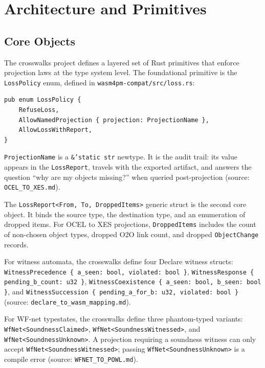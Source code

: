 
\section{Architecture and Primitives}
\label{sec:crosswalks-arch}

\subsection{Core Objects}
\label{sec:crosswalks-arch-objects}

The crosswalks project defines a layered set of Rust primitives that enforce projection laws at
the type system level. The foundational primitive is the \texttt{LossPolicy} enum, defined in
\texttt{wasm4pm-compat/src/loss.rs}:

\begin{verbatim}
pub enum LossPolicy {
    RefuseLoss,
    AllowNamedProjection { projection: ProjectionName },
    AllowLossWithReport,
}
\end{verbatim}

\texttt{ProjectionName} is a \texttt{\&'static str} newtype. It is the audit trail: its value
appears in the \texttt{LossReport}, travels with the exported artifact, and answers the question
``why are my objects missing?'' when queried post-projection (source: \texttt{OCEL\_TO\_XES.md}).

The \texttt{LossReport<From, To, DroppedItems>} generic struct is the second core object. It
binds the source type, the destination type, and an enumeration of dropped items. For \textsc{OCEL}
to \textsc{XES} projections, \texttt{DroppedItems} includes the count of non-chosen object types,
dropped \textsc{O2O} link count, and dropped \texttt{ObjectChange} records.

For witness automata, the crosswalks define four Declare witness structs: \texttt{WitnessPrecedence
\{ a\_seen: bool, violated: bool \}}, \texttt{WitnessResponse \{ pending\_b\_count: u32 \}},
\texttt{WitnessCoexistence \{ a\_seen: bool, b\_seen: bool \}}, and \texttt{WitnessSuccession
\{ pending\_a\_for\_b: u32, violated: bool \}} (source: \texttt{declare\_to\_wasm\_mapping.md}).

For WF-net typestates, the crosswalks define three phantom-typed variants:
\texttt{WfNet<SoundnessClaimed>}, \texttt{WfNet<SoundnessWitnessed>}, and
\texttt{WfNet<SoundnessUnknown>}. A projection requiring a soundness witness can only accept
\texttt{WfNet<SoundnessWitnessed>}; passing \texttt{WfNet<SoundnessUnknown>} is a compile error
(source: \texttt{WFNET\_TO\_POWL.md}).


